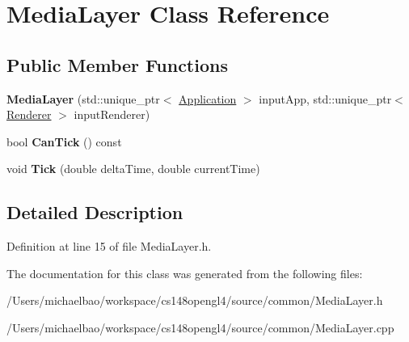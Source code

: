 \hypertarget{class_media_layer}{}\section{Media\+Layer Class Reference}
\label{class_media_layer}
\subsection*{Public Member Functions}
\begin{DoxyCompactItemize}
\item 
\hypertarget{class_media_layer_aea3b3bc36411af90517692b110d2829a}{}{\bfseries Media\+Layer} (std\+::unique\+\_\+ptr$<$ \hyperlink{class_application}{Application} $>$ input\+App, std\+::unique\+\_\+ptr$<$ \hyperlink{class_renderer}{Renderer} $>$ input\+Renderer)\label{class_media_layer_aea3b3bc36411af90517692b110d2829a}

\item 
\hypertarget{class_media_layer_a9f3b22b608b45efa23ebaebe17ae3a85}{}bool {\bfseries Can\+Tick} () const \label{class_media_layer_a9f3b22b608b45efa23ebaebe17ae3a85}

\item 
\hypertarget{class_media_layer_a570ff8c3fc3e8f3e720d9dcebafba143}{}void {\bfseries Tick} (double delta\+Time, double current\+Time)\label{class_media_layer_a570ff8c3fc3e8f3e720d9dcebafba143}

\end{DoxyCompactItemize}


\subsection{Detailed Description}


Definition at line 15 of file Media\+Layer.\+h.



The documentation for this class was generated from the following files\+:\begin{DoxyCompactItemize}
\item 
/\+Users/michaelbao/workspace/cs148opengl4/source/common/Media\+Layer.\+h\item 
/\+Users/michaelbao/workspace/cs148opengl4/source/common/Media\+Layer.\+cpp\end{DoxyCompactItemize}
